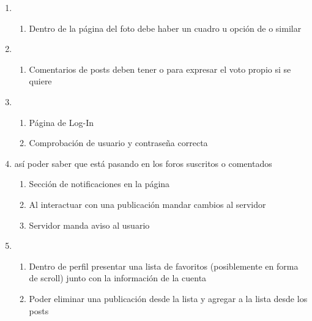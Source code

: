 \documentclass[12pt, letterpaper, notitlepage]{article}
\begin{document}
\begin{enumerate}
   
   \item {}
       	\begin{enumerate}
			\item Dentro de la página del foto debe haber un cuadro u opción de  o similar
		\end{enumerate}

   
   \item {}
       	\begin{enumerate}
			\item Comentarios de posts deben tener  o  para expresar el voto propio si se quiere
		\end{enumerate}

		
	\item {}
		\begin{enumerate}
			\item Página de Log-In
			\item Comprobación de usuario y contraseña correcta
		\end{enumerate}
		
	\item {}		
		{así poder saber que está pasando en los foros suscritos o comentados}
		\begin{enumerate}
			\item Sección de notificaciones en la página
			\item Al interactuar con una publicación mandar cambios al servidor
			\item Servidor manda aviso al usuario
		\end{enumerate}




	\item {}
    	\begin{enumerate}
			\item Dentro de perfil presentar una lista de favoritos (posiblemente en forma de scroll) junto con la información de la cuenta
			\item Poder eliminar una publicación desde la lista y agregar a la lista desde los posts
		\end{enumerate}


\end{enumerate}
\end{document}
